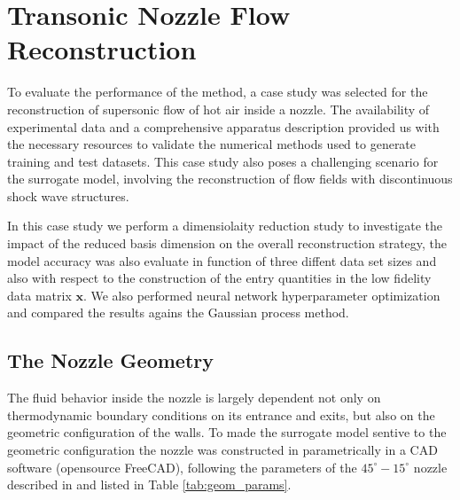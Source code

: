 \chapter{Transonic Nozzle Flow Reconstruction}
\label{chap:Case_Study}

To evaluate the performance of the method, a case study was selected for the reconstruction of supersonic flow of hot air inside a nozzle. The availability of experimental data and a comprehensive apparatus description \citep{Back1965a} provided us with the necessary resources to validate the numerical methods used to generate training and test datasets. This case study also poses a challenging scenario for the surrogate model, involving the reconstruction of flow fields with discontinuous shock wave structures.

In this case study we perform a dimensiolaity reduction study to investigate the impact of the reduced basis dimension on the overall reconstruction strategy, the model accuracy was also evaluate in function of three diffent data set sizes and also with respect to the construction of the entry quantities in the low fidelity data matrix $\mathbf{x}$. We also performed neural network hyperparameter optimization and compared the results agains the Gaussian process method.



\section{The Nozzle Geometry}

The fluid behavior inside the nozzle is largely dependent not only on thermodynamic boundary conditions on its entrance and exits, but also on the geometric configuration of the walls. To made the surrogate model sentive to the geometric configuration the nozzle was constructed in parametrically in a CAD software (opensource FreeCAD), following the parameters of the $45^\circ-15^\circ$ nozzle described in \cite{Back1965a} and listed in Table \ref{tab:geom_params}.

